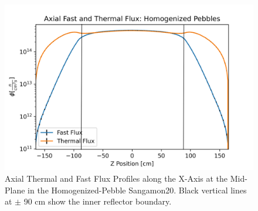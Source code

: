 \begin{figure}[H]
\centering

\includegraphics[width=0.95\linewidth]{figures/fast_therm_flux_homog_zv2.png}

\caption{Axial Thermal and Fast Flux Profiles along the X-Axis at the Mid-Plane in the Homogenized-Pebble Sangamon20.  Black vertical lines at $\pm$ 90 cm show the inner reflector boundary.}
\label{fig:hom-det-z}
\end{figure}